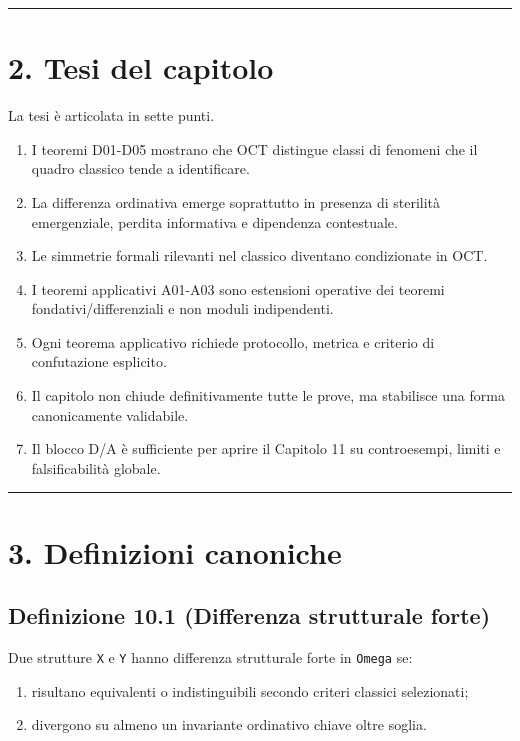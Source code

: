 \begin{center}\rule{0.5\linewidth}{0.5pt}\end{center}

\section{2. Tesi del capitolo}

La tesi è articolata in sette punti.

\begin{enumerate}
\def\labelenumi{\arabic{enumi}.}
\tightlist
\item
  I teoremi D01-D05 mostrano che OCT distingue classi di fenomeni che il quadro classico tende a identificare.
\item
  La differenza ordinativa emerge soprattutto in presenza di sterilità emergenziale, perdita informativa e dipendenza contestuale.
\item
  Le simmetrie formali rilevanti nel classico diventano condizionate in OCT.
\item
  I teoremi applicativi A01-A03 sono estensioni operative dei teoremi fondativi/differenziali e non moduli indipendenti.
\item
  Ogni teorema applicativo richiede protocollo, metrica e criterio di confutazione esplicito.
\item
  Il capitolo non chiude definitivamente tutte le prove, ma stabilisce una forma canonicamente validabile.
\item
  Il blocco D/A è sufficiente per aprire il Capitolo 11 su controesempi, limiti e falsificabilità globale.
\end{enumerate}

\begin{center}\rule{0.5\linewidth}{0.5pt}\end{center}

\section{3. Definizioni canoniche}

\subsection{Definizione 10.1 (Differenza strutturale forte)}

Due strutture \texttt{X} e \texttt{Y} hanno differenza strutturale forte in \texttt{Omega} se:

\begin{enumerate}
\def\labelenumi{\arabic{enumi}.}
\tightlist
\item
  risultano equivalenti o indistinguibili secondo criteri classici selezionati;
\item
  divergono su almeno un invariante ordinativo chiave oltre soglia.
\end{enumerate}

